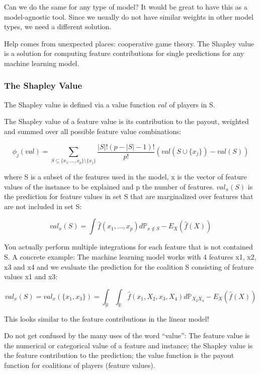 \documentclass[
  12pt,
]{krantz}
\begin{document}
Can we do the same for any type of model?
It would be great to have this as a model-agnostic tool.
Since we usually do not have similar weights in other model types, we need a different solution.

Help comes from unexpected places: cooperative game theory.
The Shapley value is a solution for computing feature contributions for single predictions for any machine learning model.

\hypertarget{the-shapley-value}{%
\subsubsection{The Shapley Value}\label{the-shapley-value}}

The Shapley value is defined via a value function \(val\) of players in S.

The Shapley value of a feature value is its contribution to the payout, weighted and summed over all possible feature value combinations:

\[\phi_j(val)=\sum_{S\subseteq\{x_{1},\ldots,x_{p}\}\setminus\{x_j\}}\frac{|S|!\left(p-|S|-1\right)!}{p!}\left(val\left(S\cup\{x_j\}\right)-val(S)\right)\]

where S is a subset of the features used in the model, x is the vector of feature values of the instance to be explained and p the number of features.
\(val_x(S)\) is the prediction for feature values in set S that are marginalized over features that are not included in set S:

\[val_{x}(S)=\int\hat{f}(x_{1},\ldots,x_{p})d\mathbb{P}_{x\notin{}S}-E_X(\hat{f}(X))\]

You actually perform multiple integrations for each feature that is not contained S.
A concrete example:
The machine learning model works with 4 features x1, x2, x3 and x4 and we evaluate the prediction for the coalition S consisting of feature values x1 and x3:

\[val_{x}(S)=val_{x}(\{x_{1},x_{3}\})=\int_{\mathbb{R}}\int_{\mathbb{R}}\hat{f}(x_{1},X_{2},x_{3},X_{4})d\mathbb{P}_{X_2X_4}-E_X(\hat{f}(X))\]

This looks similar to the feature contributions in the linear model!

Do not get confused by the many uses of the word ``value'':
The feature value is the numerical or categorical value of a feature and instance;
the Shapley value is the feature contribution to the prediction;
the value function is the payout function for coalitions of players (feature values).
\end{document}
